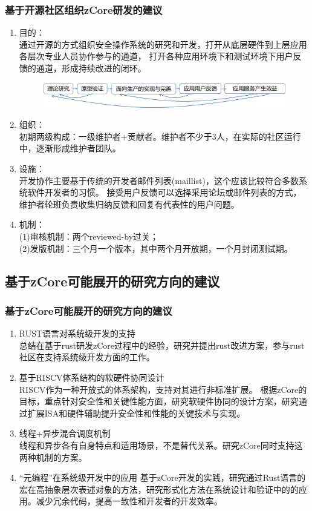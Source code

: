 \documentclass[
8pt, %
]{beamer}
\begin{document}
	\begin{frame}
		\frametitle{基于开源社区组织zCore研发的建议}
		\begin{enumerate}
			\item 目的：\\
			通过开源的方式组织安全操作系统的研究和开发，打开从底层硬件到上层应用各层次专业人员协作参与的通道，
			打开各种应用环境下和测试环境下用户反馈的通道，形成持续改进的闭环。
			\begin{figure}
				\includegraphics[width=1.0\linewidth]{open_community.png}
			\end{figure}
			\item 组织：\\
			初期两级构成：一级维护者+贡献者。维护者不少于3人，在实际的社区运行中，逐渐形成维护者团队。
			\item 设施：\\
			开发协作主要基于传统的开发者邮件列表(maillist)，这个应该比较符合多数系统软件开发者的习惯。
			接受用户反馈可以选择采用论坛或邮件列表的方式，维护者轮班负责收集归纳反馈和回复有代表性的用户问题。
			\item 机制：\\
			(1)审核机制：两个reviewed-by过关；\\
			(2)发版机制：三个月一个版本，其中两个月开放期，一个月封闭测试期。
		\end{enumerate}
	\end{frame}

	\subsection{基于zCore可能展开的研究方向的建议}

	\begin{frame}
		\frametitle{基于zCore可能展开的研究方向的建议}
		\begin{enumerate}
			\item RUST语言对系统级开发的支持\\
			总结在基于rust研发zCore过程中的经验，研究并提出rust改进方案，参与rust社区在支持系统级开发方面的工作。
			\item 基于RISCV体系结构的软硬件协同设计\\
			RISCV作为一种开放式的体系架构，支持对其进行非标准扩展。
			根据zCore的目标，重点针对安全性和关键性能方面，研究软硬件协同的设计方案，研究通过扩展ISA和硬件辅助提升安全性和性能的关键技术与实现。
			\item 线程+异步混合调度机制\\
			线程和异步各有自身特点和适用场景，不是替代关系。研究zCore同时支持这两种机制的方案。
			\item “元编程”在系统级开发中的应用
			基于zCore开发的实践，研究通过Rust语言的宏在高抽象层次表述对象的方法，研究形式化方法在系统设计和验证中的的应用。减少冗余代码，提高一致性和开发者的开发效率。
		\end{enumerate}
	\end{frame}
\end{document}
